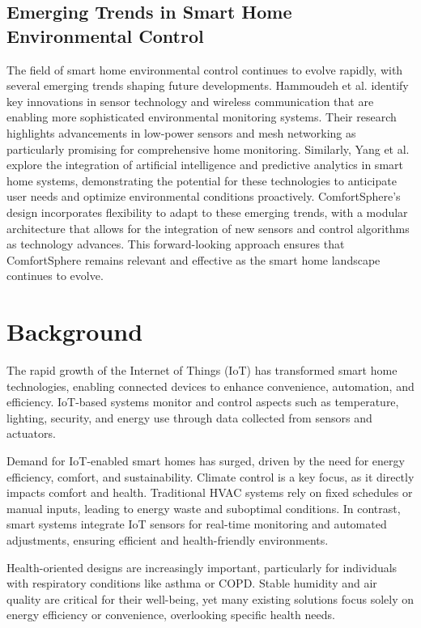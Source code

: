\documentclass[a4paper]{scrartcl}
\begin{document}
    \subsection{Emerging Trends in Smart Home Environmental Control}
    The field of smart home environmental control continues to evolve rapidly, with several emerging trends shaping future developments. Hammoudeh et al. \cite{paper25} identify key innovations in sensor technology and wireless communication that are enabling more sophisticated environmental monitoring systems. Their research highlights advancements in low-power sensors and mesh networking as particularly promising for comprehensive home monitoring. Similarly, Yang et al. \cite{paper26} explore the integration of artificial intelligence and predictive analytics in smart home systems, demonstrating the potential for these technologies to anticipate user needs and optimize environmental conditions proactively. ComfortSphere's design incorporates flexibility to adapt to these emerging trends, with a modular architecture that allows for the integration of new sensors and control algorithms as technology advances. This forward-looking approach ensures that ComfortSphere remains relevant and effective as the smart home landscape continues to evolve.

	\section{Background}
	\label{sec:background}
	The rapid growth of the Internet of Things (IoT) has transformed smart home technologies, enabling connected devices to enhance convenience, automation, and efficiency. IoT-based systems monitor and control aspects such as temperature, lighting, security, and energy use through data collected from sensors and actuators.

	Demand for IoT-enabled smart homes has surged, driven by the need for energy efficiency, comfort, and sustainability. Climate control is a key focus, as it directly impacts comfort and health. Traditional HVAC systems rely on fixed schedules or manual inputs, leading to energy waste and suboptimal conditions. In contrast, smart systems integrate IoT sensors for real-time monitoring and automated adjustments, ensuring efficient and health-friendly environments.

	Health-oriented designs are increasingly important, particularly for individuals with respiratory conditions like asthma or COPD. Stable humidity and air quality are critical for their well-being, yet many existing solutions focus solely on energy efficiency or convenience, overlooking specific health needs.
\end{document}

